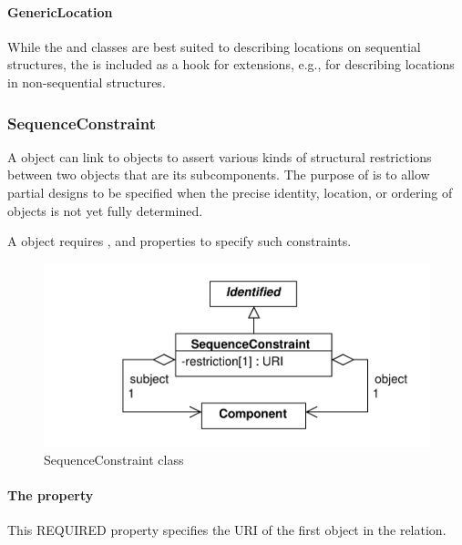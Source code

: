 \paragraph{GenericLocation}
\label{sec:GenericLocation}

While the  and  classes are best suited to
describing locations on sequential structures, the
 is included as a hook for extensions, e.g., for
describing locations in non-sequential structures.


\subsubsection{SequenceConstraint}
\label{sec:SequenceConstraint}
A  object can link to  objects to assert various kinds of structural restrictions between two  objects that are its subcomponents. 
The purpose of  is to allow partial designs to be specified when the precise identity, location, or ordering of  objects is not yet fully determined.

A  object requires ,  and  properties to specify such constraints.

\begin{figure}[ht]
\begin{center}
\includegraphics[scale=0.6]{uml/sequence_constraint}
\caption[]{SequenceConstraint class}
\label{uml:sequence_constraint}
\end{center}
\end{figure}

\paragraph{The  property}
\label{sec:subject}
This REQUIRED property specifies the  URI of the first  object in the relation.

